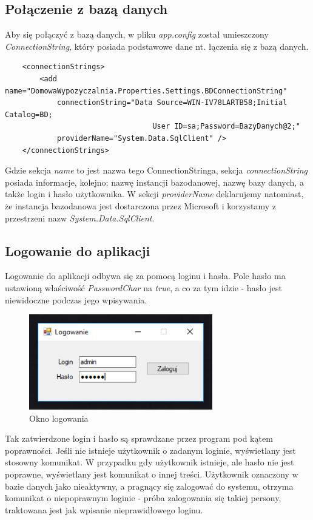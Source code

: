 \documentclass{article}
\begin{document}
\subsection{Połączenie z bazą danych}
Aby się połączyć z bazą danych, w pliku \textit{app.config} został umieszczony \textit{ConnectionString}, który posiada podstawowe dane nt. łączenia się z bazą danych.
\begin{verbatim}
    <connectionStrings>
        <add name="DomowaWypozyczalnia.Properties.Settings.BDConnectionString"
            connectionString="Data Source=WIN-IV78LARTB58;Initial Catalog=BD;
                                  User ID=sa;Password=BazyDanych@2;"
            providerName="System.Data.SqlClient" />
    </connectionStrings>
\end{verbatim}
Gdzie sekcja \textit{name} to jest nazwa tego ConnectionStringa, sekcja \textit{connectionString} posiada informacje, kolejno; nazwę instancji bazodanowej, nazwę bazy danych, a także login i hasło użytkownika. W sekcji \textit{providerName} deklarujemy natomiast, że instancja bazodanowa jest dostarczona przez Microsoft i korzystamy z przestrzeni nazw \textit{System.Data.SqlClient}.
\subsection{Logowanie do aplikacji}
Logowanie do aplikacji odbywa się za pomocą loginu i hasła. Pole hasło ma ustawioną właściwość \textit{PasswordChar} na \textit{true}, a co za tym idzie - hasło jest niewidoczne podczas jego wpisywania.
\begin{figure}[!ht]
\centering
\includegraphics[width=8cm]{logowanie.PNG}
\caption{Okno logowania}
\end{figure}

Tak zatwierdzone login i hasło są sprawdzane przez program pod kątem poprawności. Jeśli nie istnieje użytkownik o zadanym loginie, wyświetlany jest stosowny komunikat. W przypadku gdy użytkownik istnieje, ale hasło nie jest poprawne, wyświetlany jest komunikat o innej treści. Użytkownik oznaczony w bazie danych jako nieaktywny, a pragnący się zalogować do systemu, otrzyma komunikat o niepoprawnym loginie - próba zalogowania się takiej persony, traktowana jest jak wpisanie nieprawidłowego loginu.
\end{document}
